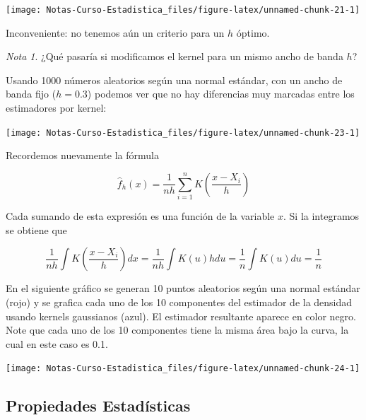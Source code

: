 \documentclass[
  12pt,
]{book}
\theoremstyle{definition}
\theoremstyle{definition}
\theoremstyle{definition}
\theoremstyle{definition}
\theoremstyle{remark}
\newtheorem*{remark}{Nota}
\begin{document}
\begin{center}\texttt{[image: Notas-Curso-Estadistica\_files/figure-latex/unnamed-chunk-21-1]} \end{center}

Inconveniente: no tenemos aún un criterio para un \(h\) óptimo.

\begin{remark}
¿Qué pasaría si modificamos el kernel para un mismo ancho de banda \(h\)?
\end{remark}

Usando 1000 números aleatorios según una normal estándar, con un ancho de banda fijo (\(h=0.3\)) podemos ver que no hay diferencias muy marcadas entre los estimadores por kernel:

\begin{center}\texttt{[image: Notas-Curso-Estadistica\_files/figure-latex/unnamed-chunk-23-1]} \end{center}

Recordemos nuevamente la fórmula

\begin{equation*}
\hat{f}_{h}\left( x \right) = \frac{1}{nh}\sum_{i=1}^{n} K\left( \frac{x-X_{i}}{h} \right)
\end{equation*}

Cada sumando de esta expresión es una función de la variable \(x\). Si la integramos se obtiene que

\begin{equation*}
\frac{1}{nh}\int K\left( \frac{x-X_{i}}{h} \right) dx
= \frac{1}{nh} \int K\left( u \right) h du
= \frac{1}{n} \int K(u) du
= \frac{1}{n}
\end{equation*}

En el siguiente gráfico se generan 10 puntos aleatorios según una normal estándar (rojo) y se grafica cada uno de los 10 componentes del estimador de la densidad usando kernels gaussianos (azul). El estimador resultante aparece en color negro. Note que cada uno de los 10 componentes tiene la misma área bajo la curva, la cual en este caso es 0.1.

\begin{center}\texttt{[image: Notas-Curso-Estadistica\_files/figure-latex/unnamed-chunk-24-1]} \end{center}

\hypertarget{propiedades-estaduxedsticas-2}{%
\subsection{Propiedades Estadísticas}\label{propiedades-estaduxedsticas-2}}
\end{document}
